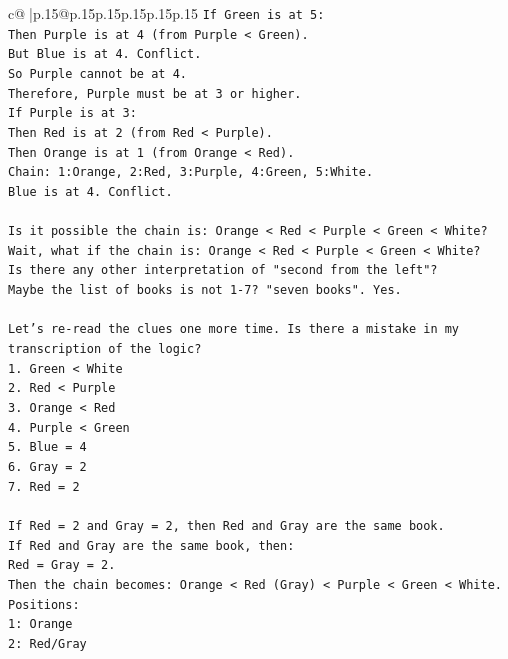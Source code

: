 \documentclass{article}
\begin{document}
{\begin{supertabular}{c@{$\;$}|p{.15\linewidth}@{}p{.15\linewidth}p{.15\linewidth}p{.15\linewidth}p{.15\linewidth}p{.15\linewidth}}
{{{\texttt{If Green is at 5:} \\
\texttt{Then Purple is at 4 (from Purple < Green).} \\
\texttt{But Blue is at 4. Conflict.} \\
\texttt{So Purple cannot be at 4.} \\
\texttt{Therefore, Purple must be at 3 or higher.} \\
\texttt{If Purple is at 3:} \\
\texttt{Then Red is at 2 (from Red < Purple).} \\
\texttt{Then Orange is at 1 (from Orange < Red).} \\
\texttt{Chain: 1:Orange, 2:Red, 3:Purple, 4:Green, 5:White.} \\
\texttt{Blue is at 4. Conflict.} \\
\\ 
\texttt{Is it possible the chain is: Orange < Red < Purple < Green < White?} \\
\texttt{Wait, what if the chain is: Orange < Red < Purple < Green < White?} \\
\texttt{Is there any other interpretation of "second from the left"?} \\
\texttt{Maybe the list of books is not 1{-}7? "seven books". Yes.} \\
\\ 
\texttt{Let's re{-}read the clues one more time. Is there a mistake in my transcription of the logic?} \\
\texttt{1. Green < White} \\
\texttt{2. Red < Purple} \\
\texttt{3. Orange < Red} \\
\texttt{4. Purple < Green} \\
\texttt{5. Blue = 4} \\
\texttt{6. Gray = 2} \\
\texttt{7. Red = 2} \\
\\ 
\texttt{If Red = 2 and Gray = 2, then Red and Gray are the same book.} \\
\texttt{If Red and Gray are the same book, then:} \\
\texttt{Red = Gray = 2.} \\
\texttt{Then the chain becomes: Orange < Red (Gray) < Purple < Green < White.} \\
\texttt{Positions:} \\
\texttt{1: Orange} \\
\texttt{2: Red/Gray} \\
}}}
\end{supertabular}}
\end{document}
